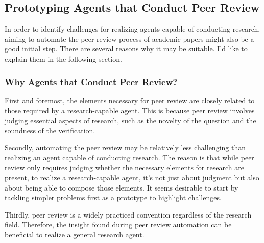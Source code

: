 \subsection{Prototyping Agents that Conduct Peer Review}
In order to identify challenges for realizing agents capable of conducting research, aiming to automate the peer review process of academic papers might also be a good initial step. There are several reasons why it may be suitable. I'd like to explain them in the following section.

\subsubsection{Why Agents that Conduct Peer Review?}

First and foremost, the elements necessary for peer review are closely related to those required by a research-capable agent. This is because peer review involves judging essential aspects of research, such as the novelty of the question and the soundness of the verification.

Secondly, automating the peer review may be relatively less challenging than realizing an agent capable of conducting research. The reason is that while peer review only requires judging whether the necessary elements for research are present, to realize a research-capable agent, it's not just about judgment but also about being able to compose those elements. It seems desirable to start by tackling simpler problems first as a prototype to highlight challenges.


Thirdly, peer review is a widely practiced convention regardless of the research field. Therefore, the insight found during peer review automation can be beneficial to realize a general research agent. 

